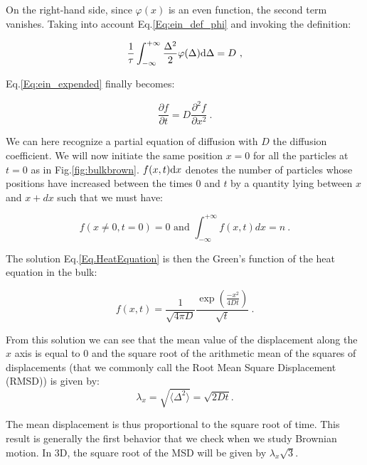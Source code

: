 On the right-hand side, since $\varphi(x)$ is an even function, the second term vanishes. Taking into account Eq.\ref{Eq:ein_def_phi} and invoking the definition:



\begin{equation}
	\frac{1}{\tau} \int_{-\infty}^{+\infty} \frac{\Delta^2}{2}\varphi(\Delta)\textnormal{d}\Delta = D ~,
\end{equation}

Eq.\ref{Eq:ein_expended} finally becomes:

\begin{equation}
	\frac{\partial f}{\partial t} = D \frac{\partial ^2 f}{\partial x ^2} ~.
	\label{Eq.HeatEquation}
\end{equation}


We can here recognize a partial equation of diffusion with $D$ the diffusion coefficient. We will now initiate the same position $x=0$ for all the particles at $t=0$ as in Fig.\ref{fig:bulkbrown}. $f(x,t)\textnormal{d}x$ denotes the number of particles whose positions have increased between the times  $0$ and $t$  by a quantity lying between $x$ and $x + dx$ such that we must have:

\begin{equation}
	f(x \ne 0, t=0) = 0 \text{ and } \int_{-\infty}^{+\infty}f(x,t)dx = n ~.
\end{equation}

The solution Eq.\ref{Eq.HeatEquation} is then the Green's function of the heat equation in the bulk:


\begin{equation}
	f(x,t) = \frac{1}{\sqrt{4\pi D}} \frac{\exp \left(\frac{-x^2}{4Dt} \right)}{\sqrt{t}} ~.
\end{equation}

From this solution we can see that the mean value of the displacement along the $x$ axis is equal to $0$ and the square root of the arithmetic mean of the squares of displacements (that we commonly call the Root Mean Square Displacement (R\gls{MSD}))  is given by:
\begin{equation}
	\lambda _x = \sqrt{\langle \Delta ^2 \rangle} =  \sqrt{2Dt}.
	\label{Eq:MSD_ein}
\end{equation}

The mean displacement is thus proportional to the square root of time. This result is generally the first behavior that we check when we study Brownian motion. In 3D, the square root of the \gls{MSD} will be given by $\lambda_x \sqrt{3}$.

